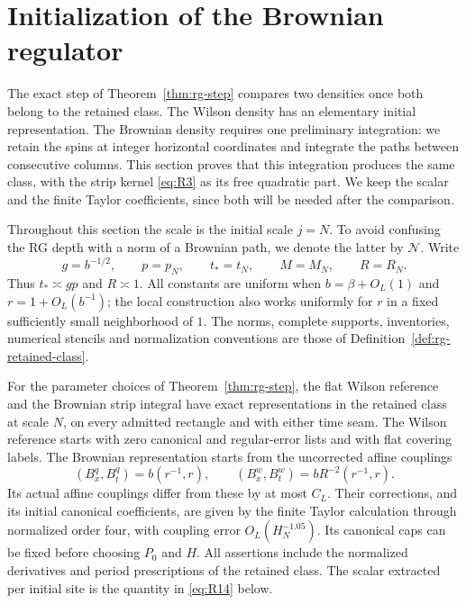 \section{Initialization of the Brownian regulator}
\label{sec:initialization}

The exact step of Theorem~\ref{thm:rg-step} compares two densities once both
belong to the retained class.  The Wilson density has an elementary
initial representation.  The Brownian density requires one preliminary
integration: we retain the spins at integer horizontal coordinates and
integrate the paths between consecutive columns.  This section proves
that this integration produces the same class, with the strip kernel
\eqref{eq:R3} as its free quadratic part.  We keep the scalar and the finite
Taylor coefficients, since both will be needed after the comparison.

Throughout this section the scale is the initial scale $j=N$.  To avoid
confusing the RG depth with a norm of a Brownian path, we denote the latter
by $\mathcal N$.  Write
\[
 g=b^{-1/2},\qquad p=p_N,\qquad t_*=t_N,\qquad M=M_N,\qquad R=R_N.
\]
Thus $t_*\asymp gp$ and $R\asymp1$.  All constants are uniform when
$b=\beta+O_L(1)$ and $r=1+O_L(b^{-1})$; the local construction also works
uniformly for $r$ in a fixed sufficiently small neighborhood of $1$.
The norms, complete supports, inventories, numerical stencils and
normalization conventions are those of
Definition~\ref{def:rg-retained-class}.

\begin{proposition}
\label{prop:init-density}
For the parameter choices of Theorem~\ref{thm:rg-step}, the flat Wilson
reference and the Brownian strip integral have exact representations in
the retained class at scale $N$, on every admitted rectangle and with
either time seam.  The Wilson reference starts with zero canonical and
regular-error lists and with flat covering labels.  The Brownian
representation starts from the uncorrected affine couplings
\[
 (B_x^q,B_t^q)=b(r^{-1},r),\qquad
 (B_x^w,B_t^w)=bR^{-2}(r^{-1},r).
\]
Its actual affine couplings differ from these by at most $C_L$.  Their
corrections, and its initial canonical coefficients, are given by the
finite Taylor calculation through normalized order four, with coupling
error $O_L(H_N^{-1.05})$.  Its canonical caps can be fixed before choosing
$P_0$ and $H$.  All assertions include the normalized derivatives and
period prescriptions of the retained class.  The scalar extracted per
initial site is the quantity in \eqref{eq:R14} below.
\end{proposition}

